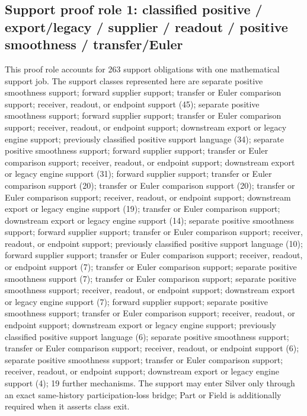 \subsection{Support proof role 1: classified positive / export/legacy / supplier / readout / positive smoothness / transfer/Euler}
This proof role accounts for 263 support obligations with one mathematical support job. The support classes represented here are separate positive smoothness support; forward supplier support; transfer or Euler comparison support; receiver, readout, or endpoint support (45); separate positive smoothness support; forward supplier support; transfer or Euler comparison support; receiver, readout, or endpoint support; downstream export or legacy engine support; previously classified positive support language (34); separate positive smoothness support; forward supplier support; transfer or Euler comparison support; receiver, readout, or endpoint support; downstream export or legacy engine support (31); forward supplier support; transfer or Euler comparison support (20); transfer or Euler comparison support (20); transfer or Euler comparison support; receiver, readout, or endpoint support; downstream export or legacy engine support (19); transfer or Euler comparison support; downstream export or legacy engine support (14); separate positive smoothness support; forward supplier support; transfer or Euler comparison support; receiver, readout, or endpoint support; previously classified positive support language (10); forward supplier support; transfer or Euler comparison support; receiver, readout, or endpoint support (7); transfer or Euler comparison support; separate positive smoothness support (7); transfer or Euler comparison support; separate positive smoothness support; receiver, readout, or endpoint support; downstream export or legacy engine support (7); forward supplier support; separate positive smoothness support; transfer or Euler comparison support; receiver, readout, or endpoint support; downstream export or legacy engine support; previously classified positive support language (6); separate positive smoothness support; transfer or Euler comparison support; receiver, readout, or endpoint support (6); separate positive smoothness support; transfer or Euler comparison support; receiver, readout, or endpoint support; downstream export or legacy engine support (4); 19 further mechanisms. The support may enter Silver only through an exact same-history participation-loss bridge; Part or Field is additionally required when it asserts class exit.

